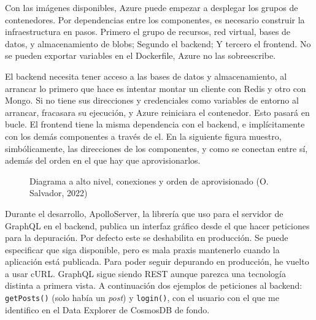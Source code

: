 \documentclass[11pt]{article}
\begin{document}
\begin{flushleft}
	Con las imágenes disponibles, Azure puede empezar a desplegar los grupos de contenedores. Por dependencias entre los componentes, es necesario construir la infraestructura en pasos. Primero el grupo de recursos, red virtual, bases de datos, y almacenamiento de blobs; Segundo el backend; Y tercero el frontend. No se pueden exportar variables en el Dockerfile, Azure no las sobreescribe.
	\linebreak
	
	El backend necesita tener acceso a las bases de datos y almacenamiento, al arrancar lo primero que hace es intentar montar un cliente con Redis y otro con Mongo. Si no tiene sus direcciones y credenciales como variables de entorno al arrancar, fracasara su ejecución, y Azure reiniciara el contenedor. Esto pasará en bucle. El frontend tiene la misma dependencia con el backend, e implícitamente con los demás componentes a través de el. En la siguiente figura muestro, simbólicamente, las direcciones de los componentes, y como se conectan entre sí, además del orden en el que hay que aprovisionarlos.
	\linebreak	
				
		\begin{figure}[htb]
			\centering
			\caption{Diagrama a alto nivel, conexiones y orden de aprovisionado (O. Salvador, 2022)}
		\end{figure}		
		
	Durante el desarrollo, ApolloServer, la librería que uso para el servidor de GraphQL en el backend, publica un interfaz gráfico desde el que hacer peticiones para la depuración. Por defecto este se deshabilita en producción. Se puede especificar que siga disponible, pero es mala praxis mantenerlo cuando la aplicación está publicada. Para poder seguir depurando en producción, he vuelto a usar cURL. GraphQL sigue siendo REST aunque parezca una tecnología distinta a primera vista. A continuación dos ejemplos de peticiones al backend: \texttt{getPosts()} (solo había un \textit{post}) y \texttt{login()}, con el usuario con el que me identifico en el Data Explorer de CosmosDB de fondo.
	\linebreak
	

\end{flushleft}
\end{document}
